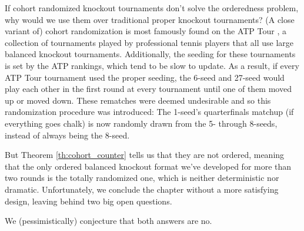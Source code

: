 {    If cohort randomized knockout tournaments don't solve the orderedness problem, why would we use them over traditional proper knockout tournaments? (A close variant of) cohort randomization is most famously found on the ATP Tour \cite{wiki_atp}, a collection of tournaments played by professional tennis players that all use large balanced knockout tournaments. Additionally, the seeding for these tournaments is set by the ATP rankings, which tend to be slow to update. As a result, if every ATP Tour tournament used the proper seeding, the 6-seed and 27-seed would play each other in the first round at every tournament until one of them moved up or moved down. These rematches were deemed undesirable and so this randomization procedure was introduced: The 1-seed's quarterfinals matchup (if everything goes chalk) is now randomly drawn from the 5- through 8-seeds, instead of always being the 8-seed.

    But Theorem \ref{th:cohort_counter} tells us that they are not ordered, meaning that the only ordered balanced knockout format we've developed for more than two rounds is the totally randomized one, which is neither deterministic nor dramatic. Unfortunately, we conclude the chapter without a more satisfying design, leaving behind two big open questions.
    


    We (pessimistically) conjecture that both answers are no.
    }
